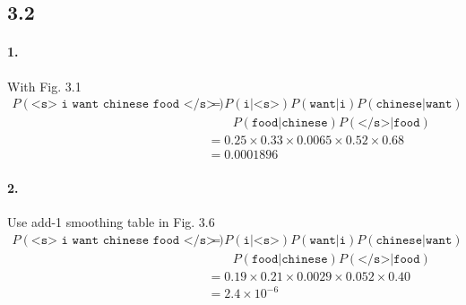 \documentclass{article}
\begin{document}
\subsection*{3.2}

\paragraph{1.}
With Fig. 3.1
\begin{align*}
    P(\texttt{<s> i want chinese food </s>})
     & = P(\texttt{i|<s>}) P(\texttt{want|i}) P(\texttt{chinese|want}) \\
     & \qquad P(\texttt{food|chinese}) P(\texttt{</s>|food})           \\
     & = 0.25 \times 0.33 \times 0.0065 \times 0.52 \times 0.68        \\
     & = 0.0001896
\end{align*}

\paragraph{2.}
Use add-1 smoothing table in Fig. 3.6
\begin{align*}
    P(\texttt{<s> i want chinese food </s>})
     & = P(\texttt{i|<s>}) P(\texttt{want|i})P(\texttt{chinese|want}) \\
     & \qquad P(\texttt{food|chinese}) P(\texttt{</s>|food})          \\
     & = 0.19 \times 0.21 \times 0.0029 \times 0.052 \times 0.40      \\
     & = 2.4 \times 10^{-6}
\end{align*}
\end{document}
